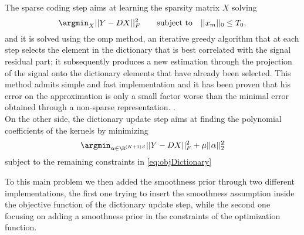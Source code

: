 The sparse coding step aims at learning the sparsity matrix $X$ solving
\begin{equation}
  \argmin_{X} ||Y - DX||^2_F \qquad \text{subject to} \quad ||x_m||_0 \leq T_0,
\end{equation}
and it is solved using the \gls{omp} method, an iterative greedy algorithm that at each step selects the element in the dictionary that is best correlated with the signal residual part; it subsequently produces a new estimation through the projection of the signal onto the dictionary elements that have already been selected. This method admits simple and fast implementation and it has been proven that his error on the approximation is only a small factor worse than the minimal error obtained through a non-sparse representation. \cite{Tropp2004}.\\

On the other side, the dictionary update step aims at finding the polynomial coefficients of the kernels by minimizing
\begin{equation}
  \argmin_{\alpha \in \R^{(K+1)S}} ||Y - DX||^2_F + \mu||\alpha||_2^2
\end{equation}
subject to the remaining constraints in \autoref{eq:objDictionary}

To this main problem we then added the smoothness prior through two different implementations, the first one trying to insert the smoothness assumption inside the objective function of the dictionary update step, while the second one focusing on adding a smoothness prior in the constraints of the optimization function.

